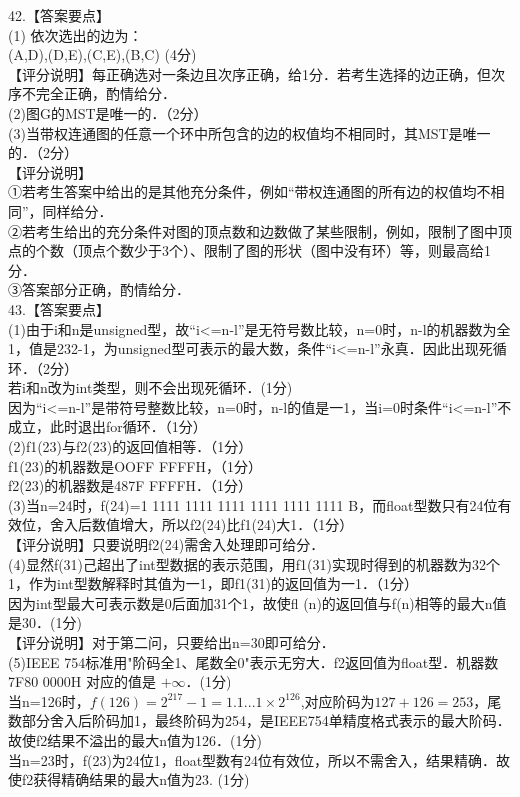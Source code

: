 42.【答案要点】 \\
(1) 依次选出的边为： \\
(A,D),(D,E),(C,E),(B,C) (4分) \\
【评分说明】每正确选对一条边且次序正确，给1分．若考生选择的边正确，但次序不完全正确，酌情给分． \\
(2)图G的MST是唯一的．（2分） \\
(3)当带权连通图的任意一个环中所包含的边的权值均不相同时，其MST是唯一的．（2分） \\
【评分说明】 \\
①若考生答案中给出的是其他充分条件，例如“带权连通图的所有边的权值均不相同”，同样给分． \\
②若考生给出的充分条件对图的顶点数和边数做了某些限制，例如，限制了图中顶点的个数（顶点个数少于3个）、限制了图的形状（图中没有环）等，则最高给1分． \\
③答案部分正确，酌情给分． \\

43.【答案要点】 \\
(1)由于i和n是unsigned型，故“i<=n-l”是无符号数比较，n=0时，n-l的机器数为全1，值是232-1，为unsigned型可表示的最大数，条件“i<=n-l”永真．因此出现死循环．（2分） \\
若i和n改为int类型，则不会出现死循环．(1分) \\
因为“i<=n-l”是带符号整数比较，n=0时，n-l的值是一1，当i=0时条件“i<=n-l”不成立，此时退出for循环．（1分） \\
(2)f1(23)与f2(23)的返回值相等．（1分） \\
f1(23)的机器数是OOFF FFFFH，（1分） \\
f2(23)的机器数是487F FFFFH．（1分） \\
(3)当n=24时，f(24)=1 1111 1111 1111 1111 1111 1111 B，而float型数只有24位有效位，舍入后数值增大，所以f2(24)比f1(24)大1．（1分） \\
【评分说明】只要说明f2(24)需舍入处理即可给分． \\
(4)显然f(31)己超出了int型数据的表示范围，用f1(31)实现时得到的机器数为32个1，作为int型数解释时其值为一1，即f1(31)的返回值为一1．（1分） \\
因为int型最大可表示数是0后面加31个1，故使fl (n)的返回值与f(n)相等的最大n值是30．(1分) \\
【评分说明】对于第二问，只要给出n=30即可给分． \\
(5)IEEE 754标准用"阶码全1、尾数全0"表示无穷大．f2返回值为float型．机器数7F80 0000H
对应的值是 $+\infty$．(1分) \\
当n=126时，$f(126)=2^{217}-1=1.1...1\times2^{126}$,对应阶码为$127+126=253$，尾数部分舍入后阶码加1，最终阶码为254，是IEEE754单精度格式表示的最大阶码．故使f2结果不溢出的最大n值为126．(1分) \\
当n=23时，f(23)为24位1，float型数有24位有效位，所以不需舍入，结果精确．故使f2获得精确结果的最大n值为23. (1分)

